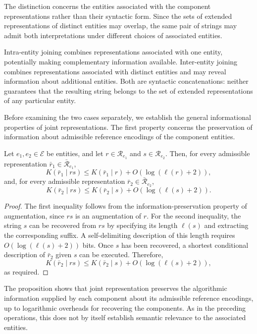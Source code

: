 The distinction concerns the entities associated with the component representations rather than their syntactic form. Since the sets of extended representations of distinct entities may overlap, the same pair of strings may admit both interpretations under different choices of associated entities.

Intra-entity joining combines representations associated with one entity, potentially making complementary information available. Inter-entity joining combines representations associated with distinct entities and may reveal information about additional entities. Both are syntactic concatenations: neither guarantees that the resulting string belongs to the set of extended representations of any particular entity.

Before examining the two cases separately, we establish the general informational properties of joint representations. The first property concerns the preservation of information about admissible reference encodings of the component entities.

\begin{proposition}
Let $e_1,e_2\in\mathcal{E}$ be entities, and let $r\in\mathcal{R}_{e_1}$ and $s\in\mathcal{R}_{e_2}$. Then, for every admissible representation $\bar r_1\in\bar{\mathcal{R}}_{e_1}$,
\[
K(\bar r_1\mid rs)\leq K(\bar r_1\mid r)+O(\log(\ell(r)+2)),
\]
and, for every admissible representation $\bar r_2\in\bar{\mathcal{R}}_{e_2}$,
\[
K(\bar r_2\mid rs)\leq K(\bar r_2\mid s)+O(\log(\ell(s)+2)).
\]
\end{proposition}
\begin{proof}
The first inequality follows from the information-preservation property of augmentation, since $rs$ is an augmentation of $r$. For the second inequality, the string $s$ can be recovered from $rs$ by specifying its length $\ell(s)$ and extracting the corresponding suffix. A self-delimiting description of this length requires $O(\log(\ell(s)+2))$ bits. Once $s$ has been recovered, a shortest conditional description of $\bar r_2$ given $s$ can be executed. Therefore,
\[
K(\bar r_2\mid rs)\leq K(\bar r_2\mid s)+O(\log(\ell(s)+2)),
\]
as required.
\end{proof}

The proposition shows that joint representation preserves the algorithmic information supplied by each component about its admissible reference encodings, up to logarithmic overheads for recovering the components. As in the preceding operations, this does not by itself establish semantic relevance to the associated entities.

